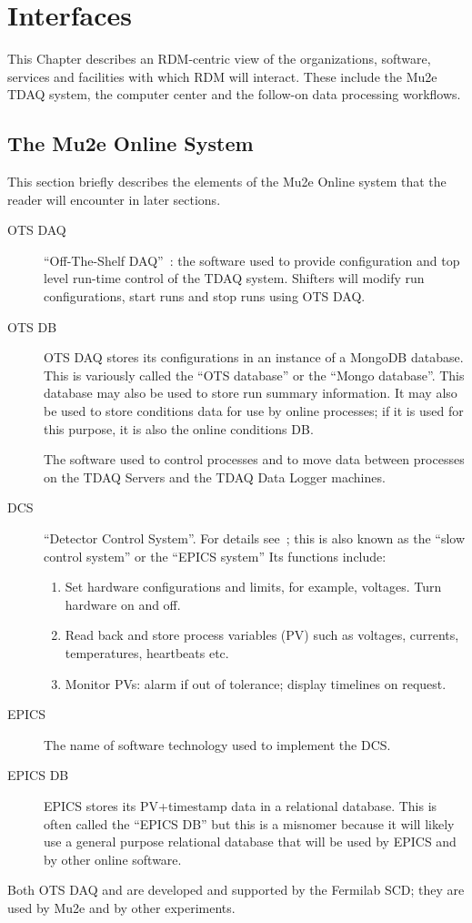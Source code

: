 \chapter{Interfaces}
\label{ch:SelectedDetails}

This Chapter describes an RDM-centric view of the organizations, software, services and facilities
with which RDM will interact.  These include the Mu2e TDAQ system,
the computer center and the follow-on data processing workflows.

\section{The Mu2e Online System}
\label{sec:Mu2eOnlineSystem}

This section briefly describes the elements of the Mu2e Online system that the reader will encounter in later sections.

\begin{description}
\item[OTS DAQ] ``Off-The-Shelf DAQ''~\cite{MU2EOTSDAQ}: the software used to provide configuration and top level run-time control of the TDAQ system.
  Shifters will modify run configurations, start runs and stop runs using OTS DAQ.
\item[OTS DB] OTS DAQ stores its configurations in an instance of a MongoDB database.
  This is variously called the ``OTS database'' or the ``Mongo database''.
  This database may also be used to store run summary information.
  It may also be used to store conditions data for use by online processes;
  if it is used for this purpose, it is also the online conditions DB.
\item[\artdaq] The software used to control processes and to move data between processes on the TDAQ Servers and the TDAQ Data Logger machines.
\item[DCS] ``Detector Control System''.
  For details see~\cite{DCSSpec};
  this is also known as the ``slow control system'' or the ``EPICS system''
  Its functions include:
  \begin{enumerate}
    \item Set hardware configurations and limits, for example, voltages.  Turn hardware on and off.
    \item Read back and store process variables (PV) such as voltages, currents, temperatures, heartbeats etc.
    \item Monitor PVs: alarm if out of tolerance; display timelines on request.
  \end{enumerate}
\item[EPICS] The name of software technology used to implement the DCS.
\item[EPICS DB] EPICS stores its PV+timestamp data in a relational database.
  This is often called the ``EPICS DB'' but this is a misnomer because it will likely use
  a general purpose relational database that will be used by EPICS
  and by other online software.
\end{description}
Both OTS DAQ and \artdaq are developed and supported by the Fermilab SCD;
they are used by Mu2e and by other experiments.


